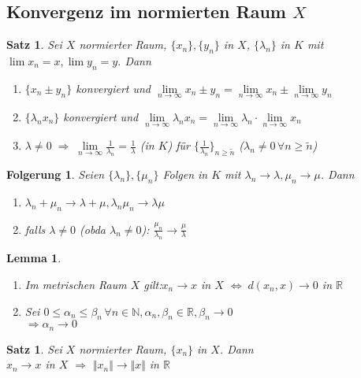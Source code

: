 \documentclass[ngerman,a4paper]{report}
\theoremstyle{break}
\newtheorem{lemma}[theorem]{Lemma}
\newtheorem{satz}[theorem]{Satz}
\newtheorem{conclusion}[theorem]{Folgerung}
\begin{document}
\subsection*{Konvergenz im normierten Raum $X$}
\begin{satz}
	Sei $X$ normierter Raum, $\{x_n\}, \{y_n\}$ in $X$, $\{\lambda_n\}$ in $K$ mit $\lim x_n = x, \lim y_n = y$. Dann
	\begin{enumerate}[label={\arabic*)}]
		\item $\{x_n \pm y_n\}$ konvergiert und $\lim\limits_{n\rightarrow\infty}x_n \pm y_n = \lim\limits_{n\rightarrow\infty} x_n \pm \lim\limits_{n\rightarrow\infty} y_n$
		\item $\{\lambda_n x_n\}$ konvergiert und $\lim\limits_{n\rightarrow\infty} \lambda_n x_n = \lim\limits_{n\rightarrow\infty} \lambda_n \cdot \lim\limits_{n\rightarrow\infty}x_n$
		\item $\lambda\neq 0 \;\Rightarrow\;\lim\limits_{n\rightarrow\infty} \frac{1}{\lambda_n} = \frac{1}{\lambda}$ (in $K$) für $\{\frac{1}{\lambda_n}\}_{n\ge\tilde{n}}$ ($\lambda_n\neq 0\,\forall n\ge\tilde{n}$)
	\end{enumerate}
\end{satz}
\begin{conclusion}
	Seien $\{\lambda_n\}, \{\mu_n\}$ Folgen in $K$ mit $\lambda_n\rightarrow\lambda,\mu_n\rightarrow\mu$. Dann
	\begin{enumerate}[label={\arabic*)}]
		\item $\lambda_n + \mu_n\rightarrow \lambda + \mu, \lambda_n \mu_n\rightarrow\lambda \mu$
		\item falls $\lambda\neq 0$ (\gls{obda} $\lambda_n\neq 0$): $\frac{\mu_n}{\lambda_n}\rightarrow\frac{\mu}{\lambda}$
	\end{enumerate}
\end{conclusion}
\begin{lemma}
	\begin{enumerate}[label={\arabic*)}]
		\item Im metrischen Raum $X$ gilt:$x_n\rightarrow x$ in $X$ $\Leftrightarrow\;d(x_n,x)\rightarrow 0$ in $\mathbb{R}$
		\item Sei $0\le \alpha_n\le\beta_n\,\forall n\in\mathbb{N}, \alpha_n, \beta_n\in\mathbb{R}, \beta_n\rightarrow 0$\\
		$\Rightarrow \alpha_n\rightarrow 0$ 
	\end{enumerate}
\end{lemma}
\begin{satz}
	Sei $X$ normierter Raum, $\{x_n\}$ in $X$. Dann\\
	$x_n\rightarrow x$ in $X$ $\Rightarrow$ $\Vert x_n\Vert \rightarrow\Vert x\Vert$ in $\mathbb{R}$
\end{satz}
\end{document}

